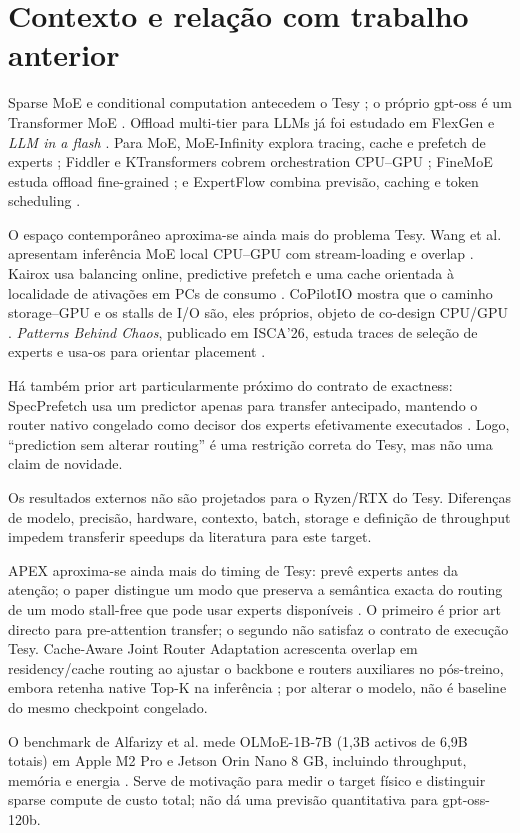 \section{Contexto e relação com trabalho anterior}
Sparse MoE e conditional computation antecedem o Tesy \cite{shazeer2017moe,fedus2022switch}; o próprio gpt-oss é um Transformer MoE \cite{openai2025gptoss}. Offload multi-tier para LLMs já foi estudado em FlexGen e \emph{LLM in a flash} \cite{sheng2023flexgen,alizadeh2024llmflash}. Para MoE, MoE-Infinity explora tracing, cache e prefetch de experts \cite{xue2024moeinfinity}; Fiddler e KTransformers cobrem orchestration CPU--GPU \cite{kamahori2025fiddler,chen2025ktransformers}; FineMoE estuda offload fine-grained \cite{yu2026finemoe}; e ExpertFlow combina previsão, caching e token scheduling \cite{he2026expertflow}.

O espaço contemporâneo aproxima-se ainda mais do problema Tesy. Wang et al. apresentam inferência MoE local CPU--GPU com stream-loading e overlap \cite{wang2026localslo}. Kairox usa balancing online, predictive prefetch e uma cache orientada à localidade de ativações em PCs de consumo \cite{jiang2026kairox}. CoPilotIO mostra que o caminho storage--GPU e os stalls de I/O são, eles próprios, objeto de co-design CPU/GPU \cite{chen2026copilotio}. \emph{Patterns Behind Chaos}, publicado em ISCA'26, estuda traces de seleção de experts e usa-os para orientar placement \cite{yu2026patterns}.

Há também prior art particularmente próximo do contrato de exactness: SpecPrefetch usa um predictor apenas para transfer antecipado, mantendo o router nativo congelado como decisor dos experts efetivamente executados \cite{kong2026specprefetch}. Logo, “prediction sem alterar routing” é uma restrição correta do Tesy, mas não uma claim de novidade.

Os resultados externos não são projetados para o Ryzen/RTX do Tesy. Diferenças de modelo, precisão, hardware, contexto, batch, storage e definição de throughput impedem transferir speedups da literatura para este target.

APEX aproxima-se ainda mais do timing de Tesy: prevê experts antes da atenção; o paper distingue um modo que preserva a semântica exacta do routing de um modo stall-free que pode usar experts disponíveis \cite{kanani2026apex}. O primeiro é prior art directo para pre-attention transfer; o segundo não satisfaz o contrato de execução Tesy. Cache-Aware Joint Router Adaptation acrescenta overlap em residency/cache routing ao ajustar o backbone e routers auxiliares no pós-treino, embora retenha native Top-K na inferência \cite{wu2026cacheaware}; por alterar o modelo, não é baseline do mesmo checkpoint congelado.

O benchmark de Alfarizy et al. mede OLMoE-1B-7B (1,3B activos de 6,9B totais) em Apple M2 Pro e Jetson Orin Nano 8 GB, incluindo throughput, memória e energia \cite{alfarizy2026consumer}. Serve de motivação para medir o target físico e distinguir sparse compute de custo total; não dá uma previsão quantitativa para gpt-oss-120b.
